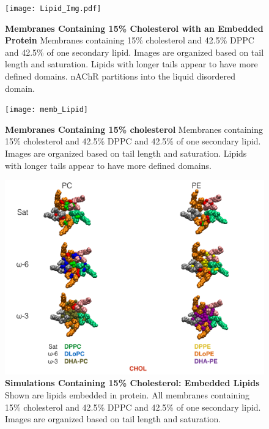 \documentclass[10pt, letterpaper]{article}
\begin{document}
\begin{figure}[H]

   \centerline{\texttt{[image: Lipid\_Img.pdf]}}
   \caption[Membranes Containing 15\% Cholesterol with an Embedded Protein]{\textbf{Membranes Containing 15\% Cholesterol with an Embedded Protein} Membranes containing 15\% cholesterol and 42.5\% DPPC and 42.5\% of one secondary lipid. Images are organized based on tail length and saturation. Lipids with longer tails appear to have more defined domains. nAChR partitions into the liquid disordered domain.}\label{fig:plips}

\end{figure}
\newpage

\begin{figure}[H]

   \centerline{\texttt{[image: memb\_Lipid]}}
   \caption[Membranes Containing 15\% Cholesterol]{\textbf{Membranes Containing 15\% cholesterol} Membranes containing 15\% cholesterol and 42.5\% DPPC and 42.5\% of one secondary lipid. Images are organized based on tail length and saturation. Lipids with longer tails appear to have more defined domains.}\label{fig:mlips}

\end{figure}
\newpage

\begin{figure}[H]

   \centerline{\includegraphics[width=\textwidth,scale=0.5]{Embeded_Lip}}
   \caption[Simulations Containing 15\% Cholesterol: Embedded Lipids]{\textbf{Simulations Containing 15\% Cholesterol: Embedded Lipids} Shown are lipids embedded in protein. All membranes containing 15\% cholesterol and 42.5\% DPPC and 42.5\% of one secondary lipid. Images are organized based on tail length and saturation.}\label{fig:elips}

\end{figure}
\newpage
\end{document}
